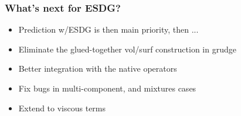 \begin{frame}\frametitle{What's next for ESDG?}
\begin{itemize}
\item Prediction w/ESDG is then main priority, then ...
\item Eliminate the glued-together vol/surf construction in grudge
\item Better integration with the native operators
\item Fix bugs in multi-component, and mixtures cases
\item Extend to viscous terms
\end{itemize}
\end{frame}
